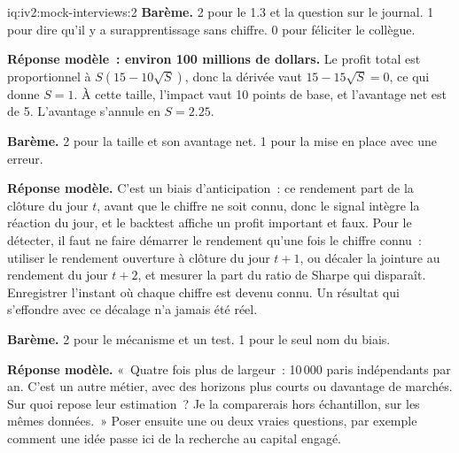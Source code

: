 \begin{solution}{iq:iv2:mock-interviews:2}
\textbf{Barème.} 2 pour le 1.3 et la question sur le journal. 1 pour dire qu'il y a surapprentissage sans chiffre. 0 pour féliciter le collègue.

\ivstop
\textbf{Réponse modèle~: environ 100 millions de dollars.} Le profit total est proportionnel à $S(15 - 10\sqrt{S})$, donc la dérivée vaut $15 - 15\sqrt{S} = 0$, ce qui donne $S = 1$. À cette taille, l'impact vaut 10 points de base, et l'avantage net est de 5. L'avantage s'annule en $S = 2.25$.

\textbf{Barème.} 2 pour la taille et son avantage net. 1 pour la mise en place avec une erreur.

\ivstop
\textbf{Réponse modèle.} C'est un biais d'anticipation~: ce rendement part de la clôture du jour $t$, avant que le chiffre ne soit connu, donc le signal intègre la réaction du jour, et le backtest affiche un profit important et faux. Pour le détecter, il faut ne faire démarrer le rendement qu'une fois le chiffre connu~: utiliser le rendement ouverture à clôture du jour $t + 1$, ou décaler la jointure au rendement du jour $t + 2$, et mesurer la part du ratio de Sharpe qui disparaît. Enregistrer l'instant où chaque chiffre est devenu connu. Un résultat qui s'effondre avec ce décalage n'a jamais été réel.

\textbf{Barème.} 2 pour le mécanisme et un test. 1 pour le seul nom du biais.

\ivstop
\textbf{Réponse modèle.} «~Quatre fois plus de largeur~: 10\,000 paris indépendants par an. C'est un autre métier, avec des horizons plus courts ou davantage de marchés. Sur quoi repose leur estimation~? Je la comparerais hors échantillon, sur les mêmes données.~» Poser ensuite une ou deux vraies questions, par exemple comment une idée passe ici de la recherche au capital engagé.


\end{solution}
